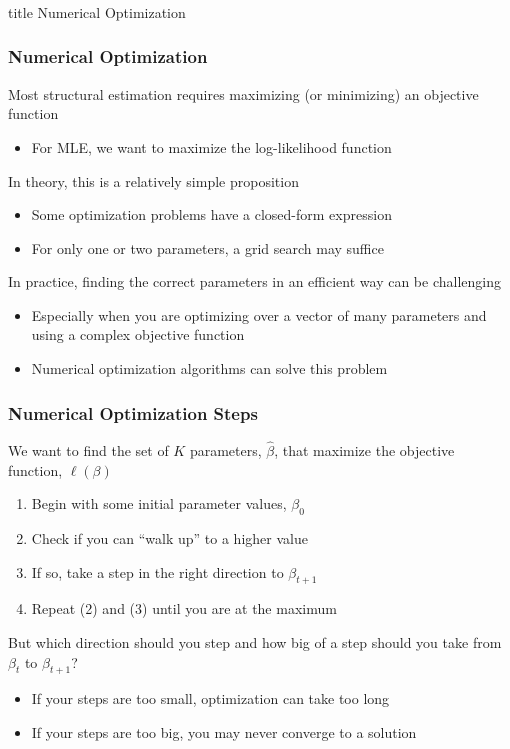 \documentclass{beamer}
\begin{document}
\begin{frame}\frametitle{}
    \vfill
    \centering
    \begin{beamercolorbox}[center]{title}
        \Large Numerical Optimization
    \end{beamercolorbox}
    \vfill
\end{frame}

\begin{frame}\frametitle{Numerical Optimization}
    Most structural estimation requires maximizing (or minimizing) an objective function
    \begin{itemize}
        \item For MLE, we want to maximize the log-likelihood function
    \end{itemize}
    \vspace{3ex}
    In theory, this is a relatively simple proposition
    \begin{itemize}
        \item Some optimization problems have a closed-form expression
        \item For only one or two parameters, a grid search may suffice
    \end{itemize}
    \vspace{3ex}
    In practice, finding the correct parameters in an efficient way can be challenging
    \begin{itemize}
        \item Especially when you are optimizing over a vector of many parameters and using a complex objective function
        \item Numerical optimization algorithms can solve this problem
    \end{itemize}
\end{frame}

\begin{frame}\frametitle{Numerical Optimization Steps}
    We want to find the set of $K$ parameters, $\hat{\beta}$, that maximize the objective function, $\ell(\beta)$
    \begin{enumerate}
        \item Begin with some initial parameter values, $\beta_0$
        \item Check if you can ``walk up'' to a higher value
        \item If so, take a step in the right direction to $\beta_{t + 1}$
        \item Repeat (2) and (3) until you are at the maximum
    \end{enumerate}
    \vspace{3ex}
    But which direction should you step and how big of a step should you take from $\beta_t$ to $\beta_{t + 1}$?
    \begin{itemize}
        \item If your steps are too small, optimization can take too long
        \item If your steps are too big, you may never converge to a solution
    \end{itemize}
\end{frame}
\end{document}
